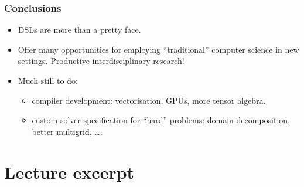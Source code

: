\documentclass[presentation]{beamer}
\begin{document}
\begin{frame}
  \frametitle{Conclusions}
  \begin{itemize}
  \item DSLs are more than a pretty face.
  \item Offer many opportunities for employing ``traditional''
    computer science in new settings.  Productive interdisciplinary
    research!
  \item Much still to do:
    \begin{itemize}
    \item compiler development: vectorisation, GPUs, more tensor
      algebra.
    \item custom solver specification for ``hard'' problems: domain
      decomposition, better multigrid, \dots.
    \end{itemize}
  \end{itemize}
\end{frame}

\section{Lecture excerpt}


\end{document}
